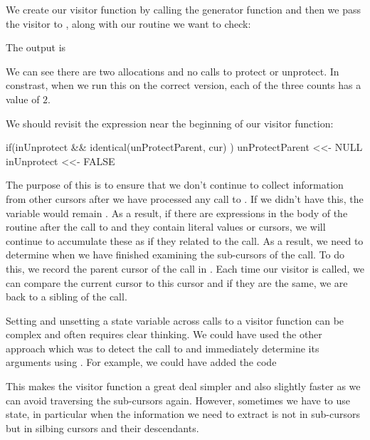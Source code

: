 We create our visitor function by calling the generator function
and then we pass the visitor to ,
along with our routine we want to check:
The output is 
We can see there are two allocations and no calls to protect or
unprotect.  
In constrast, when we run this on the correct version, 
each of the three counts has a value of $2$.

\begin{comment}
f = system.file("exampleCode", "protectCorrect.c", package = "RCIndex")
r = getRoutines(f, f, includes = sprintf("%
v = genProtectAnalyzer()
visitCursor(r$R_foo, v$update)
v$info()
\end{comment}

We should revisit the  expression near the beginning
of our visitor function:
\begin{RCode}
if(inUnprotect && identical(unProtectParent, cur) ) {
   unProtectParent <<- NULL
   inUnprotect <<- FALSE
}
\end{RCode}
The purpose of this is to ensure that we don't continue to collect
information from other cursors after we have processed any call to
.  If we didn't have this, the variable
 would remain \Rtrue.  As a result, if there are
\C{} expressions in the body of the routine after the call to
 and they contain literal values or
 cursors, we will continue to accumulate
these as if they related to the  call.  As a result,
we need to determine when we have finished examining the sub-cursors
of the  call.  To do this, we record the parent
cursor of the  call in . Each
time our visitor is called, we can compare the current cursor to this
cursor and if they are the same, we are back to a sibling of the
 call.

Setting and unsetting a state variable across calls to a visitor
function can be complex and often requires clear thinking.
We could have used the other approach which was to detect
the call to  and immediately determine its arguments
using . For example, we could have added the code
This makes the visitor function a great deal simpler and also slightly
faster as we can avoid traversing the sub-cursors again.  However,
sometimes we have to use state, in particular when the information we
need to extract is not in sub-cursors but in silbing cursors and their
descendants.


